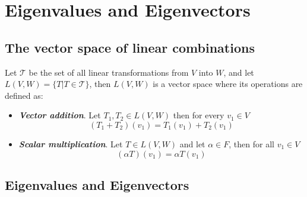 \documentclass{report}
\begin{document}
    \tableofcontents

    \pagebreak
    \chapter{ Eigenvalues and Eigenvectors }

    \section{The vector space of linear combinations}

    Let $\mathcal{T}$ be the set of all linear transformations from $V$ into $W$, and let $L(V,W) = \{T| T \in \mathcal{T}\}$, then $L(V,W)$ is a vector space where its operations are defined as:

    \begin{itemize}
        \item \textit{\textbf{Vector addition}}. Let $T_1, T_2 \in L(V,W)$ then for every $v_1 \in V$
        $$(T_1+T_2)(v_1) = T_1(v_1) + T_2(v_1)$$
        \item \textit{\textbf{Scalar multiplication}}. Let $T \in L(V,W)$ and let $\alpha \in F$, then for all $v_1 \in V$
        $$(\alpha T)(v_1) = \alpha T(v_1)$$
    \end{itemize}

    \section{Eigenvalues and Eigenvectors}

    
\end{document}
